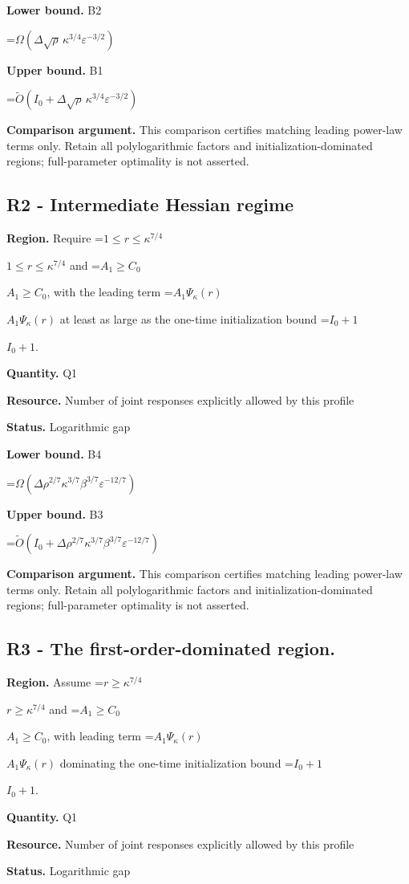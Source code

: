 \documentclass[10pt,a4paper]{article}
\newcommand{\AtlasMath}[1]{\par\begingroup\centering\setbox0=\hbox{$\displaystyle #1$}\ifdim\wd0>1.4\linewidth\typeout{ATLAS WIDE FORMULA: \the\wd0}\fi\ifdim\wd0>\linewidth\resizebox{\linewidth}{!}{\box0}\else\box0\fi\par\endgroup}
\newcommand{\AtlasInlineMath}[1]{\begingroup\setbox0=\hbox{$#1$}\ifdim\wd0>.4\linewidth\endgroup\AtlasMath{#1}\else\endgroup$#1$\fi}
\begin{document}
\textbf{Lower bound.} B2

\AtlasMath{\Omega(\Delta\sqrt\rho\,\kappa^{3/4}\varepsilon^{-3/2})}
\textbf{Upper bound.} B1

\AtlasMath{\widetilde{O}(I_0+\Delta\sqrt\rho\,\kappa^{3/4}\varepsilon^{-3/2})}
\textbf{Comparison argument.} This comparison certifies matching leading power-law terms only. Retain all polylogarithmic factors and initialization-dominated regions; full-parameter optimality is not asserted.

\subsection{R2 - Intermediate Hessian regime}
\textbf{Region.} Require \AtlasInlineMath{1\le r\le\kappa^{7/4}} and \AtlasInlineMath{A_1\ge C_0}, with the leading term \AtlasInlineMath{A_1\Psi_\kappa(r)} at least as large as the one-time initialization bound \AtlasInlineMath{I_0+1}.

\textbf{Quantity.} Q1

\textbf{Resource.} Number of joint responses explicitly allowed by this profile

\textbf{Status.} Logarithmic gap

\textbf{Lower bound.} B4

\AtlasMath{\Omega(\Delta\rho^{2/7}\kappa^{3/7}\beta^{3/7}\varepsilon^{-12/7})}
\textbf{Upper bound.} B3

\AtlasMath{\widetilde{O}(I_0+\Delta\rho^{2/7}\kappa^{3/7}\beta^{3/7}\varepsilon^{-12/7})}
\textbf{Comparison argument.} This comparison certifies matching leading power-law terms only. Retain all polylogarithmic factors and initialization-dominated regions; full-parameter optimality is not asserted.

\subsection{R3 - The first-order-dominated region.}
\textbf{Region.} Assume \AtlasInlineMath{r\ge\kappa^{7/4}} and \AtlasInlineMath{A_1\ge C_0}, with leading term \AtlasInlineMath{A_1\Psi_\kappa(r)} dominating the one-time initialization bound \AtlasInlineMath{I_0+1}.

\textbf{Quantity.} Q1

\textbf{Resource.} Number of joint responses explicitly allowed by this profile

\textbf{Status.} Logarithmic gap
\end{document}
